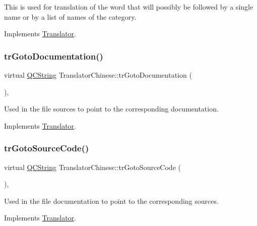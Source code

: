 This is used for translation of the word that will possibly be followed by a single name or by a list of names of the category. 

Implements \mbox{\hyperlink{class_translator}{Translator}}.

\mbox{\label{class_translator_chinese_a07f0bcd548e0087adf1b75c6ecee7732}} 
\subsubsection{\texorpdfstring{trGotoDocumentation()}{trGotoDocumentation()}}
{\footnotesize\ttfamily virtual \mbox{\hyperlink{class_q_c_string}{Q\+C\+String}} Translator\+Chinese\+::tr\+Goto\+Documentation (\begin{DoxyParamCaption}{ }\end{DoxyParamCaption})\hspace{0.3cm}{\ttfamily [inline]}, {\ttfamily [virtual]}}

Used in the file sources to point to the corresponding documentation. 

Implements \mbox{\hyperlink{class_translator}{Translator}}.

\mbox{\label{class_translator_chinese_a9e952e9121278d490d421697b1448b3a}} 
\subsubsection{\texorpdfstring{trGotoSourceCode()}{trGotoSourceCode()}}
{\footnotesize\ttfamily virtual \mbox{\hyperlink{class_q_c_string}{Q\+C\+String}} Translator\+Chinese\+::tr\+Goto\+Source\+Code (\begin{DoxyParamCaption}{ }\end{DoxyParamCaption})\hspace{0.3cm}{\ttfamily [inline]}, {\ttfamily [virtual]}}

Used in the file documentation to point to the corresponding sources. 

Implements \mbox{\hyperlink{class_translator}{Translator}}.

